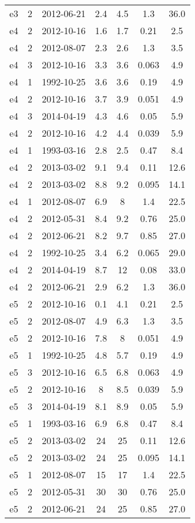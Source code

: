 \begin{table*}[htp]
\begin{tabular}{ccccccc}
e3 & 2 & 2012-06-21 & 2.4 & 4.5 & 1.3 & 36.0 \\
e4 & 2 & 2012-10-16 & 1.6 & 1.7 & 0.21 & 2.5 \\
e4 & 2 & 2012-08-07 & 2.3 & 2.6 & 1.3 & 3.5 \\
e4 & 3 & 2012-10-16 & 3.3 & 3.6 & 0.063 & 4.9 \\
e4 & 1 & 1992-10-25 & 3.6 & 3.6 & 0.19 & 4.9 \\
e4 & 2 & 2012-10-16 & 3.7 & 3.9 & 0.051 & 4.9 \\
e4 & 3 & 2014-04-19 & 4.3 & 4.6 & 0.05 & 5.9 \\
e4 & 2 & 2012-10-16 & 4.2 & 4.4 & 0.039 & 5.9 \\
e4 & 1 & 1993-03-16 & 2.8 & 2.5 & 0.47 & 8.4 \\
e4 & 2 & 2013-03-02 & 9.1 & 9.4 & 0.11 & 12.6 \\
e4 & 2 & 2013-03-02 & 8.8 & 9.2 & 0.095 & 14.1 \\
e4 & 1 & 2012-08-07 & 6.9 & 8 & 1.4 & 22.5 \\
e4 & 2 & 2012-05-31 & 8.4 & 9.2 & 0.76 & 25.0 \\
e4 & 2 & 2012-06-21 & 8.2 & 9.7 & 0.85 & 27.0 \\
e4 & 2 & 1992-10-25 & 3.4 & 6.2 & 0.065 & 29.0 \\
e4 & 2 & 2014-04-19 & 8.7 & 12 & 0.08 & 33.0 \\
e4 & 2 & 2012-06-21 & 2.9 & 6.2 & 1.3 & 36.0 \\
e5 & 2 & 2012-10-16 & 0.1 & 4.1 & 0.21 & 2.5 \\
e5 & 2 & 2012-08-07 & 4.9 & 6.3 & 1.3 & 3.5 \\
e5 & 2 & 2012-10-16 & 7.8 & 8 & 0.051 & 4.9 \\
e5 & 1 & 1992-10-25 & 4.8 & 5.7 & 0.19 & 4.9 \\
e5 & 3 & 2012-10-16 & 6.5 & 6.8 & 0.063 & 4.9 \\
e5 & 2 & 2012-10-16 & 8 & 8.5 & 0.039 & 5.9 \\
e5 & 3 & 2014-04-19 & 8.1 & 8.9 & 0.05 & 5.9 \\
e5 & 1 & 1993-03-16 & 6.9 & 6.8 & 0.47 & 8.4 \\
e5 & 2 & 2013-03-02 & 24 & 25 & 0.11 & 12.6 \\
e5 & 2 & 2013-03-02 & 24 & 25 & 0.095 & 14.1 \\
e5 & 1 & 2012-08-07 & 15 & 17 & 1.4 & 22.5 \\
e5 & 2 & 2012-05-31 & 30 & 30 & 0.76 & 25.0 \\
e5 & 2 & 2012-06-21 & 24 & 25 & 0.85 & 27.0 \\

\end{tabular}
\end{table*}
